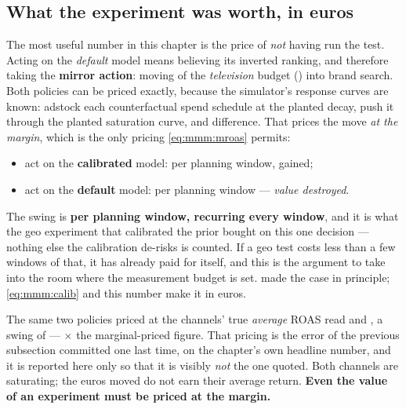 \subsection*{What the experiment was worth, in euros}

The most useful number in this chapter is the price of \emph{not} having run the test. Acting on
the \emph{default} model means believing its inverted ranking, and therefore taking the
\textbf{mirror action}: moving \pc{\nbSixShiftPct} of the \emph{television} budget
(\eur{\nbSixMirrorShiftEur}) into brand search. Both policies can be priced exactly, because the
simulator's response curves are known: adstock each counterfactual spend schedule at the planted
decay, push it through the planted saturation curve, and difference. That prices the move
\emph{at the margin}, which is the only pricing \cref{eq:mmm:mroas} permits:

\begin{itemize}[leftmargin=*]
  \item act on the \textbf{calibrated} model: \eur{\nbSixTrueDeltaSat} per planning window, gained;
  \item act on the \textbf{default} model: \eur{\nbSixMirrorDeltaSat} per planning window ---
        \emph{value destroyed}.
\end{itemize}

The swing is \eur{\nbSixExperimentSwingSat} \textbf{per planning window, recurring every window},
and it is what the geo experiment that calibrated the prior bought on this one
\pc{\nbSixShiftPct} decision --- nothing else the calibration de-risks is counted. If a geo test
costs less than a few windows of that, it has already paid for itself, and this is the argument to
take into the room where the measurement budget is set.  made the case in
principle; \cref{eq:mmm:calib} and this number make it in euros.

The same two policies priced at the channels' true \emph{average} ROAS read \eur{\nbSixTrueDelta}
and \eur{\nbSixMirrorDelta}, a swing of \eur{\nbSixExperimentSwing} ---
\nbSixSwingAvgOverSat$\times$ the marginal-priced figure. That pricing is the error of the previous
subsection committed one last time, on the chapter's own headline number, and it is reported here
only so that it is visibly \emph{not} the one quoted. Both channels are saturating; the euros moved
do not earn their average return. \textbf{Even the value of an experiment must be priced at the
margin.}

